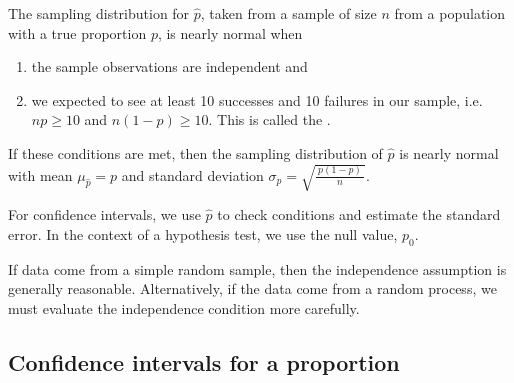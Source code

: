 

\begin{termBox}{
The sampling distribution for $\hat{p}$, taken from a sample of size $n$ from a population with a true proportion $p$, is nearly normal when
\begin{enumerate}
\item the sample observations are independent and
\item we expected to see at least 10 successes and 10 failures in our sample, i.e. $np\geq10$ and $n(1-p)\geq10$. This is called the .
\end{enumerate}
If these conditions are met, then the sampling distribution of $\hat{p}$ is nearly normal with mean $\mu_{\hat{p}}=p$ and standard deviation $\sigma_{\hat{p}} = \sqrt{\frac{\ p(1-p)\ }{n}}$.}
\end{termBox}


\begin{termBox}{
For confidence intervals, we use $\hat{p}$ to check conditions and estimate the standard error. In the context of a hypothesis test, we use the null value, $p_0$.}
\end{termBox}

\begin{tipBox}{
If data come from a simple random sample, then the independence assumption is generally reasonable. Alternatively, if the data come from a random process, we must evaluate the independence condition more carefully.}
\end{tipBox}


\subsection{Confidence intervals for a proportion}
\label{confIntForPropSection}

